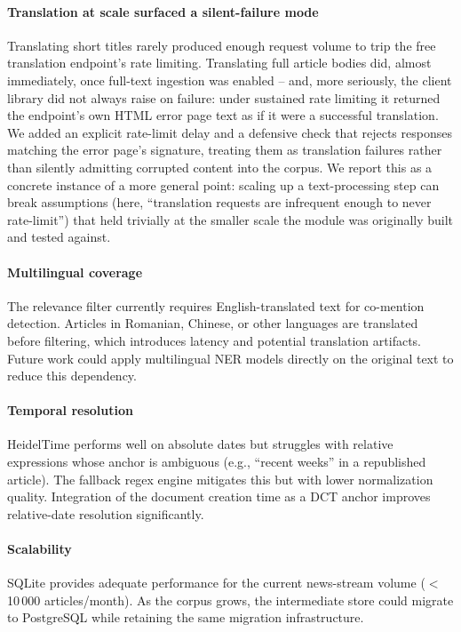 \documentclass[conference]{IEEEtran}
\begin{document}
\paragraph{Translation at scale surfaced a silent-failure mode}
Translating short titles rarely produced enough request volume to trip the
free translation endpoint's rate limiting. Translating full article bodies
did, almost immediately, once full-text ingestion was enabled -- and, more
seriously, the client library did not always raise on failure: under
sustained rate limiting it returned the endpoint's own HTML error page text
as if it were a successful translation. We added an explicit rate-limit
delay and a defensive check that rejects responses matching the error
page's signature, treating them as translation failures rather than silently
admitting corrupted content into the corpus. We report this as a concrete
instance of a more general point: scaling up a text-processing step can
break assumptions (here, ``translation requests are infrequent enough to
never rate-limit'') that held trivially at the smaller scale the module was
originally built and tested against.

\paragraph{Multilingual coverage}
The relevance filter currently requires English-translated text for
co-mention detection. Articles in Romanian, Chinese, or other languages are
translated before filtering, which introduces latency and potential
translation artifacts. Future work could apply multilingual NER models
directly on the original text to reduce this dependency.

\paragraph{Temporal resolution}
HeidelTime performs well on absolute dates but struggles with relative
expressions whose anchor is ambiguous (e.g., ``recent weeks'' in a
republished article). The fallback regex engine mitigates this but with
lower normalization quality. Integration of the document creation time
as a DCT anchor improves relative-date resolution significantly.

\paragraph{Scalability}
SQLite provides adequate performance for the current news-stream volume
($<$10\,000 articles/month). As the corpus grows, the intermediate
store could migrate to PostgreSQL while retaining the same migration
infrastructure.
\end{document}
